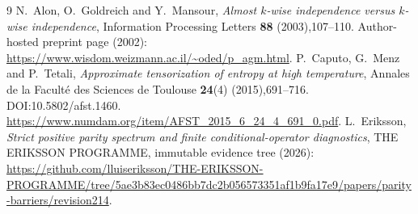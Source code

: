 \documentclass[11pt]{article}
\begin{document}
\begin{thebibliography}{9}\small
{} N.~Alon, O.~Goldreich and Y.~Mansour,
\emph{Almost $k$-wise independence versus $k$-wise independence},
Information Processing Letters \textbf{88} (2003),107--110.
Author-hosted preprint page (2002):
\url{https://www.wisdom.weizmann.ac.il/~oded/p_agm.html}.
 P.~Caputo, G.~Menz and P.~Tetali,
\emph{Approximate tensorization of entropy at high temperature},
Annales de la Facult\'e des Sciences de Toulouse \textbf{24}(4)
(2015),691--716. DOI:10.5802/afst.1460.
\url{https://www.numdam.org/item/AFST_2015_6_24_4_691_0.pdf}.
 L.~Eriksson, \emph{Strict positive parity spectrum
and finite conditional-operator diagnostics}, THE ERIKSSON PROGRAMME,
immutable evidence tree (2026):
\url{https://github.com/lluiseriksson/THE-ERIKSSON-PROGRAMME/tree/5ae3b83ec0486bb7dc2b056573351af1b9fa17e9/papers/parity-barriers/revision214}.
\end{thebibliography}
\end{document}
